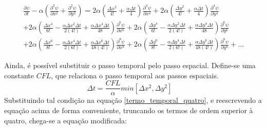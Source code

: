 \documentclass[a0,portrait]{a0poster}
\begin{document}
\begin{minipage}[c]{\linewidth}
\begin{framed}
\begin{multicols}{2}
\begin{equation} \label{termo_temporal_quatro}
\begin{split}
\frac{\partial \psi}{\partial t} - \alpha \left(\frac{\partial^{2} \psi}{\partial x^{2}} + \frac{\partial^{2} \psi}{\partial y^{2}} \right) = 2\alpha \left(\frac{\Delta x^{2}}{4!} +\frac{\alpha \Delta t}{4}\right) \frac{\partial^{4}\psi}{\partial x^{4}} +2\alpha \left(\frac{\Delta y^{2}}{4!} +\frac{\alpha \Delta t}{4}\right) \frac{\partial^{4}\psi}{\partial y^{4}} \\  +2 \alpha \left(\frac{\Delta x^{4}}{6!} - \frac{\alpha \Delta x^{2}\Delta t}{2(4!)} + \frac{\alpha \Delta x^{4}\Delta t}{48}\right) \frac{\partial^{6}\psi}{\partial x^{6}} + 2\alpha \left(\frac{\Delta y^{4}}{6!}- \frac{\alpha \Delta y^{2}\Delta t}{2(4!)} + \frac{\alpha \Delta y^{4}\Delta t}{48}\right) \frac{\partial^{6}\psi}{\partial y^{6}} \\ + 2 \alpha \left(\frac{\Delta x^{6}}{8!} - \frac{\alpha \Delta x^{4}\Delta t}{2(6!)} + \frac{\alpha \Delta x^{6}\Delta t}{48(4!)} \right) \frac{\partial^{8}\psi}{\partial x^{8}} + 2 \alpha \left(\frac{\Delta y^{6}}{8!} - \frac{\alpha \Delta y^{4}\Delta t}{2(6!)} + \frac{\alpha \Delta y^{6}\Delta t}{48(4!)} \right) \frac{\partial^{8}\psi}{\partial y^{8}} + ...
\end{split}
\end{equation}	

Ainda, é possível substituir o passo temporal pelo passo espacial. Define-se uma constante $CFL$, que relaciona o passo temporal aos passos espaciais.
\begin{equation} \label{CFL_one}
\Delta t = \frac{CFL}{\alpha} min[\Delta x^{2}, \Delta y^{2} ] \ \ \ \ \ 
\end{equation}
Substituindo tal condição na equação \ref{termo_temporal_quatro}, e reescrevendo a equação acima de forma conveniente, truncando os termos de ordem superior à quatro, chega-se a equação modificada:



\end{multicols}
\end{framed}
\end{minipage}
\end{document}
